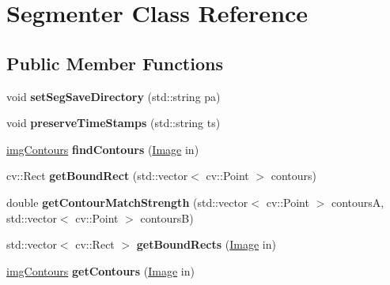 \hypertarget{classSegmenter}{}\section{Segmenter Class Reference}
\label{classSegmenter}
\subsection*{Public Member Functions}
\begin{DoxyCompactItemize}
\item 
void {\bfseries set\+Seg\+Save\+Directory} (std\+::string pa)\hypertarget{classSegmenter_a1ca48cfbc029301763745cdff63c7315}{}\label{classSegmenter_a1ca48cfbc029301763745cdff63c7315}

\item 
void {\bfseries preserve\+Time\+Stamps} (std\+::string ts)\hypertarget{classSegmenter_aafe298f611a3e6ecbea5781e12375f64}{}\label{classSegmenter_aafe298f611a3e6ecbea5781e12375f64}

\item 
\hyperlink{structimgContours}{img\+Contours} {\bfseries find\+Contours} (\hyperlink{classImage}{Image} in)\hypertarget{classSegmenter_a7ec373f9e197294079cca622deab4db8}{}\label{classSegmenter_a7ec373f9e197294079cca622deab4db8}

\item 
cv\+::\+Rect {\bfseries get\+Bound\+Rect} (std\+::vector$<$ cv\+::\+Point $>$ contours)\hypertarget{classSegmenter_a4dfd1e2d42b757eaa2b148279dd7e26d}{}\label{classSegmenter_a4dfd1e2d42b757eaa2b148279dd7e26d}

\item 
double {\bfseries get\+Contour\+Match\+Strength} (std\+::vector$<$ cv\+::\+Point $>$ contoursA, std\+::vector$<$ cv\+::\+Point $>$ contoursB)\hypertarget{classSegmenter_a1b926b90d0700e7c6da07fa8a8b7bcc2}{}\label{classSegmenter_a1b926b90d0700e7c6da07fa8a8b7bcc2}

\item 
std\+::vector$<$ cv\+::\+Rect $>$ {\bfseries get\+Bound\+Rects} (\hyperlink{classImage}{Image} in)\hypertarget{classSegmenter_ab38db258ca0f5a7d38881da059bb3cbf}{}\label{classSegmenter_ab38db258ca0f5a7d38881da059bb3cbf}

\item 
\hyperlink{structimgContours}{img\+Contours} {\bfseries get\+Contours} (\hyperlink{classImage}{Image} in)\hypertarget{classSegmenter_aaf871a36de6c8306f4b632ab09292d32}{}\label{classSegmenter_aaf871a36de6c8306f4b632ab09292d32}


\end{DoxyCompactItemize}
